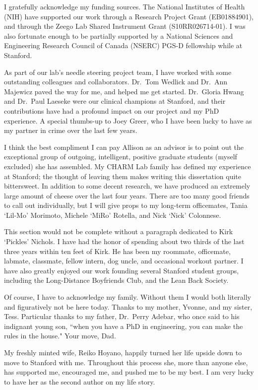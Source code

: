 \documentclass[12pt,twoside]{report}
\begin{document}
I gratefully acknowledge my funding sources. The National Institutes of Health (NIH) have supported our work through a Research Project Grant (EB01884901), and through the Zeego Lab Shared Instrument Grant (S10RR026714-01). I was also fortunate enough to be partially supported by a National Sciences and Engineering Research Council of Canada (NSERC) PGS-D fellowship while at Stanford.   

As part of our lab's needle steering project team, I have worked with some outstanding colleagues and collaborators. Dr.\ Tom Wedlick and Dr.\ Ann Majewicz paved the way for me, and helped me get started. Dr.\ Gloria Hwang and Dr.\ Paul Laeseke were our clinical champions at Stanford, and their  contributions have had a profound impact on our project and my PhD experience. A special thumbs-up to Joey Greer, who I have been lucky to have as my partner in crime over the last few years.

I think the best compliment I can pay Allison as an advisor is to point out the exceptional group of outgoing, intelligent, positive graduate students (myself excluded) she has assembled. My CHARM Lab family has defined my experience at Stanford; the thought of leaving them makes writing this dissertation quite bittersweet. In addition to some decent research, we have produced an extremely large amount of cheese over the last four years. There are too many good friends to call out individually, but I will give props to my long-term officemates, Tania `Lil-Mo' Morimoto, Michele `MiRo' Rotella, and Nick `Nick' Colonnese. 

This section would not be complete without a paragraph dedicated to Kirk `Pickles' Nichols. I have had the honor of spending about two thirds of the last three years within ten feet of Kirk. He has been my roommate, officemate, labmate, classmate, fellow intern, dog uncle, and occasional workout partner. I have also greatly enjoyed our work founding several Stanford student groups, including the Long-Distance Boyfriends Club, and the Lean Back Society.     

Of course, I have to acknowledge my family. Without them I would both literally and figuratively not be here today. Thanks to my mother, Yvonne, and my sister, Tess. Particular thanks to my father, Dr.\ Perry Adebar, who once said to his indignant young son, ``when you have a PhD in engineering, you can make the rules in the house." Your move, Dad.

My freshly minted wife, Reiko Hoyano, happily turned her life upside down to move to Stanford with me. Throughout this process she, more than anyone else, has supported me, encouraged me, and pushed me to be my best. I am very lucky to have her as the second author on my life story.
\end{document}
